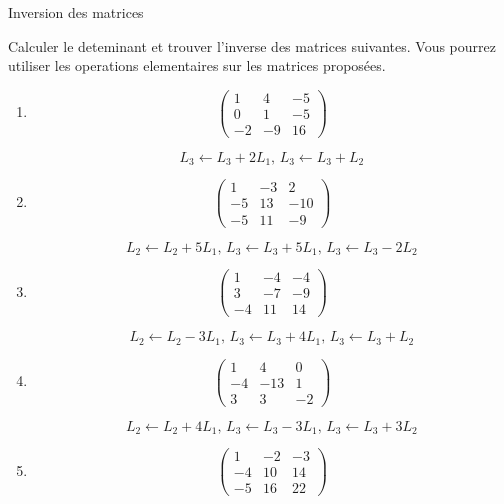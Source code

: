 \documentclass{article}
\begin{document}
\begin{center}
{\Large Inversion des matrices}\\
\end{center}



\noindent
Calculer le deteminant et  trouver l'inverse des matrices suivantes.
Vous pourrez utiliser les operations elementaires sur les matrices proposées.


\begin{enumerate}



\item
$$ \begin{pmatrix}
1 & 4 & -5 \\ 
0 & 1 & -5 \\ 
-2 & -9 & 16
\end{pmatrix} $$


$$ L_3 \leftarrow L_3 + 2L_1,\, 
L_3 \leftarrow L_3 + L_2 $$
\item
$$ \begin{pmatrix}
1 & -3 & 2 \\ 
-5 & 13 & -10 \\ 
-5 & 11 & -9
\end{pmatrix} $$


$$ L_2 \leftarrow L_2 + 5L_1,\, 
L_3 \leftarrow L_3 + 5L_1,\, 
L_3 \leftarrow L_3 - 2L_2 $$
\item
$$ \begin{pmatrix}
1 & -4 & -4 \\ 
3 & -7 & -9 \\ 
-4 & 11 & 14
\end{pmatrix} $$


$$ L_2 \leftarrow L_2 - 3L_1,\, 
L_3 \leftarrow L_3 + 4L_1,\, 
L_3 \leftarrow L_3 + L_2 $$
\item
$$ \begin{pmatrix}
1 & 4 & 0 \\ 
-4 & -13 & 1 \\ 
3 & 3 & -2
\end{pmatrix} $$


$$ L_2 \leftarrow L_2 + 4L_1,\, 
L_3 \leftarrow L_3 - 3L_1,\, 
L_3 \leftarrow L_3 + 3L_2 $$
\item
$$ \begin{pmatrix}
1 & -2 & -3 \\ 
-4 & 10 & 14 \\ 
-5 & 16 & 22
\end{pmatrix} $$


\end{enumerate}
\end{document}
